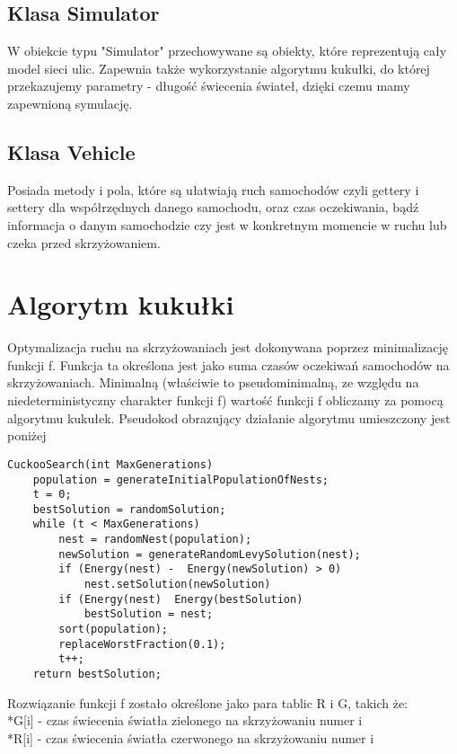 \documentclass{article}
\begin{document}
\subsection{Klasa Simulator}
    W obiekcie typu "Simulator" przechowywane są obiekty, które reprezentują cały model sieci ulic. Zapewnia także wykorzystanie algorytmu kukułki, do której przekazujemy parametry - długość świecenia świateł, dzięki czemu mamy zapewnioną symulację.

\subsection{Klasa Vehicle}
    Posiada metody i pola, które są ułatwiają ruch samochodów czyli gettery i settery dla współrzędnych danego samochodu, oraz czas oczekiwania, bądź informacja o danym samochodzie czy jest w konkretnym momencie w ruchu lub czeka przed skrzyżowaniem.

\section{Algorytm kukułki}
    Optymalizacja ruchu na skrzyżowaniach jest dokonywana poprzez minimalizację funkcji f. Funkcja ta określona jest jako suma czasów oczekiwań samochodów na skrzyżowaniach. Minimalną (właściwie to pseudominimalną, ze względu na niedeterministyczny charakter funkcji f) wartość funkcji f 
    obliczamy za pomocą algorytmu kukułek. Pseudokod obrazujący działanie algorytmu umieszczony jest poniżej

\begin{lstlisting}
CuckooSearch(int MaxGenerations)
    population = generateInitialPopulationOfNests;
    t = 0;
    bestSolution = randomSolution;
    while (t < MaxGenerations)
        nest = randomNest(population);
        newSolution = generateRandomLevySolution(nest);
        if (Energy(nest) -  Energy(newSolution) > 0)
            nest.setSolution(newSolution)
        if (Energy(nest)  Energy(bestSolution)
            bestSolution = nest;
        sort(population);
        replaceWorstFraction(0.1);
        t++;
    return bestSolution;
\end{lstlisting}

Rozwiązanie funkcji f zostało określone jako para tablic R i G, takich że: 
\\*G[i]  - czas świecenia światła zielonego na skrzyżowaniu numer i
\\*R[i]  - czas świecenia światła czerwonego na skrzyżowaniu numer i
\end{document}
